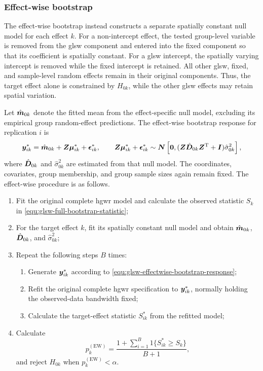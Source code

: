 \documentclass[times]{interact}
\theoremstyle{plain}%
\theoremstyle{definition}
\theoremstyle{remark}
\begin{document}
\subsubsection{Effect-wise bootstrap}

The effect-wise bootstrap instead constructs a separate spatially constant null model for each effect $k$.
For a non-intercept effect, the tested group-level variable is removed from the \gls{glsw} component and entered into the fixed component so that its coefficient is spatially constant.
For a \gls{glsw} intercept, the spatially varying intercept is removed while the fixed intercept is retained.
All other \gls{glsw}, fixed, and sample-level random effects remain in their original components.
Thus, the target effect alone is constrained by $H_{0k}$, while the other \gls{glsw} effects may retain spatial variation.

Let $\hat{\bm{m}}_{0k}$ denote the fitted mean from the effect-specific null model, excluding its empirical group random-effect predictions.
The effect-wise bootstrap response for replication $i$ is
\begin{equation}\label{equ:glsw-effectwise-bootstrap-response}
  \bm{y}^{*}_{ik}
  = \hat{\bm{m}}_{0k}
  + \bm{Z}\bm{\mu}^{*}_{ik}
  + \bm{\epsilon}^{*}_{ik},
  \qquad
  \bm{Z}\bm{\mu}^{*}_{ik}+\bm{\epsilon}^{*}_{ik}
  \sim \bm{N}\left[
    \bm{0},
    (\bm{Z}\hat{\bm{D}}_{0k}\bm{Z}^\mathrm{T}+\bm{I})\hat{\sigma}^{2}_{0k}
  \right],
\end{equation}
where $\hat{\bm{D}}_{0k}$ and $\hat{\sigma}^{2}_{0k}$ are estimated from that null model.
The coordinates, covariates, group membership, and group sample sizes again remain fixed.
The effect-wise procedure is as follows.
\begin{enumerate}[label=\textbf{Step \arabic*.}, left=0.5em, itemindent=2em]
  \item Fit the original complete \gls{hgwr} model and calculate the observed statistic $S_k$ in \autoref{equ:glsw-full-bootstrap-statistic};
  \item For the target effect $k$, fit its spatially constant null model and obtain $\hat{\bm{m}}_{0k}$, $\hat{\bm{D}}_{0k}$, and $\hat{\sigma}^{2}_{0k}$;
  \item Repeat the following steps $B$ times:
  \begin{enumerate}
    \item Generate $\bm{y}^{*}_{ik}$ according to \autoref{equ:glsw-effectwise-bootstrap-response};
    \item Refit the original complete \gls{hgwr} specification to $\bm{y}^{*}_{ik}$, normally holding the observed-data bandwidth fixed;
    \item Calculate the target-effect statistic $S^{*}_{ik}$ from the refitted model;
  \end{enumerate}
  \item Calculate
  \begin{equation}\label{equ:glsw-effectwise-bootstrap-pvalue}
    p^{(\mathrm{EW})}_k
    = \frac{1+\sum_{i=1}^{B}1\{S^{*}_{ik}\geq S_k\}}{B+1},
  \end{equation}
  and reject $H_{0k}$ when $p^{(\mathrm{EW})}_k<\alpha$.
\end{enumerate}
\end{document}
